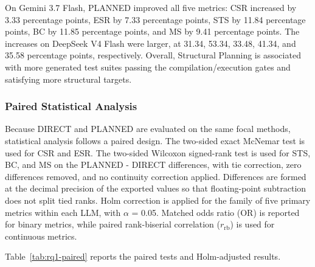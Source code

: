\documentclass[pdflatex,sn-basic,Numbered,iicol]{sn-jnl}
\begin{document}
On Gemini 3.7 Flash, PLANNED improved all five metrics: CSR increased by 3.33 percentage points, ESR by 7.33 percentage points, STS by 11.84 percentage points, BC by 11.85 percentage points, and MS by 9.41 percentage points. The increases on DeepSeek V4 Flash were larger, at 31.34, 53.34, 33.48, 41.34, and 35.58 percentage points, respectively. Overall, Structural Planning is associated with more generated test suites passing the compilation/execution gates and satisfying more structural targets.

\subsubsection{Paired Statistical Analysis}\label{subsubsec:rq1-paired}

Because DIRECT and PLANNED are evaluated on the same focal methods, statistical analysis follows a paired design. The two-sided exact McNemar test is used for CSR and ESR. The two-sided Wilcoxon signed-rank test is used for STS, BC, and MS on the PLANNED - DIRECT differences, with tie correction, zero differences removed, and no continuity correction applied. Differences are formed at the decimal precision of the exported values so that floating-point subtraction does not split tied ranks. Holm correction is applied for the family of five primary metrics within each LLM, with \ensuremath{\alpha} = 0.05. Matched odds ratio (OR) is reported for binary metrics, while paired rank-biserial correlation ($r_{\mathrm{rb}}$) is used for continuous metrics.

Table~\ref{tab:rq1-paired} reports the paired tests and Holm-adjusted results.
\end{document}
